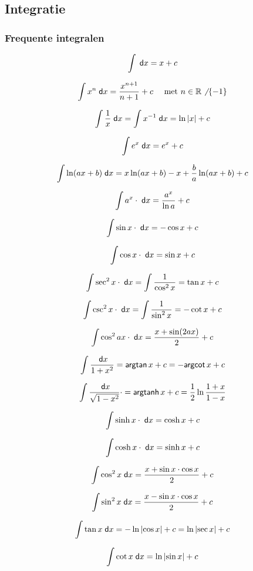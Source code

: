 \twocolumn
\subsection{Integratie}
\label{sec:Integralen}

\subsubsection{Frequente integralen}
\label{sec:FundamenteleIntegralen}

\[
 \int \;\textsf{d}x = x + c
\]

\[
 \int x^n \;\textsf{d}x = \frac{x^{n+1}}{n+1} + c \quad \mbox{ met } n \in \mathbb{R} \not \; \left\{-1\right\}
\]

\[
 \int \frac{1}{x} \;\textsf{d}x = \int x^{-1}\;\textsf{d}x = \ln \left| x \right| + c
\]

\[
 \int e^x \;\textsf{d}x = e^x + c
\]

\[
 \int\ln (ax + b) \;\textsf{d}x = x\ln (ax +b) - x + \frac{b}{a}\ln (ax + b) + c
\]

\[
 \int a^x \cdot \;\textsf{d}x = \frac{a^x}{\ln a}+ c
\]

\[
 \int \sin x \cdot \;\textsf{d}x = - \cos x + c
\]

\[
 \int \cos x \cdot \;\textsf{d}x = \sin x + c
\]

\[
 \int \sec^2 x \cdot \;\textsf{d}x = \int \frac{1}{\cos^2 x} = \tan x + c
\]

\[
 \int \csc^2 x \cdot \;\textsf{d}x = \int \frac{1}{\sin^2 x} = - \cot x + c
\]

\[
 \int \cos^2 ax \cdot \;\textsf{d}x = \frac{x + \sin(2ax)}{2} + c
\]

\[
 \int \frac{\;\textsf{d}x}{1+x^2} = \mbox{\textsf{argtan}}\, x + c = - \mbox{\textsf{argcot}}\, x + c
\]


\[
 \int \frac{\;\textsf{d}x}{\sqrt{1-x^2}} \cdot  = \mbox{\textsf{argtanh}}\, x + c = \frac{1}{2} \ln \frac{1+x}{1-x}
\]

\[
 \int \sinh x \cdot \;\textsf{d}x = \cosh x + c
\]

\[
 \int \cosh x \cdot \;\textsf{d}x = \sinh x + c
\]

\[
 \int \cos^2 x \;\textsf{d}x = \frac{x + \sin x \cdot \cos x}{2} + c 
\]

\[
 \int \sin^2 x \;\textsf{d}x = \frac{x - \sin x \cdot \cos x}{2} + c 
\]

\[
 \int \tan x \;\textsf{d}x = -\ln\left|\cos x \right| + c = \ln\left|\sec x \right| + c
\]

\[
 \int \cot x \;\textsf{d}x = \ln\left|\sin x \right| + c
\]

